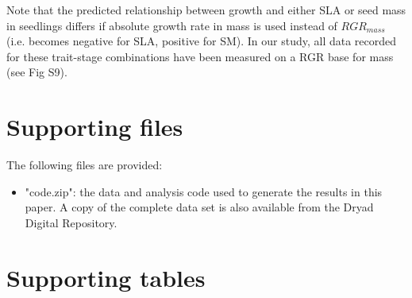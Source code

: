 \documentclass[a4paper]{article}\usepackage[]{graphicx}\usepackage[]{color}
\begin{document}
Note that the predicted relationship between growth and either SLA or seed mass in seedlings differs if absolute growth rate in mass is used instead of $RGR_{mass}$ (i.e. becomes negative for SLA, positive for SM). In our study, all data recorded for these trait-stage combinations have been measured on a RGR base for mass (see Fig S9).

\newpage
\begin{appendices}\label{sec:appendices}
\renewcommand{\thefigure}{S\arabic{figure}}
\renewcommand{\thetable}{S\arabic{table}}

\setcounter{figure}{0}
\setcounter{table}{0}

\section{Supporting files}\label{app:supp_info_files}

The following files are provided:

\begin{itemize}
  \item "code.zip": the data and analysis code used to generate the results in this paper. A copy of the complete data set is also available from the Dryad Digital Repository.
\end{itemize}


\newpage
\section{Supporting tables}\label{app:supp_info_tables}

\linespread{1}


\end{appendices}
\end{document}
